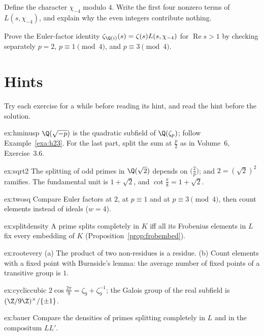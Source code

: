 \begin{exercise}[$\star\star$]\label{ex:v13-extra-11-3}
Define the character $\chi_{-4}$ modulo $4$. Write the first four nonzero terms of $L(s,\chi_{-4})$, and explain why the even integers contribute nothing.
\end{exercise}

\begin{exercise}[$\star\star\star$]\label{ex:v13-extra-11-4}
Prove the Euler-factor identity $\zeta_{\Q(i)}(s)=\zeta(s)L(s,\chi_{-4})$ for $\operatorname{Re}s>1$ by checking separately $p=2$, $p\equiv1\pmod4$, and $p\equiv3\pmod4$.
\end{exercise}

\section{Hints}

Try each exercise for a while before reading its hint, and read the hint before the solution.

\begin{hint}{ex:hminusp}
$\Q(\sqrt{-p})$ is the quadratic subfield of $\Q(\zeta_p)$; follow Example~\ref{exa:h23}. For the last part, split the sum at $\frac p2$ as in
Volume~6, Exercise~3.6.
\end{hint}
\begin{hint}{ex:sqrt2}
The splitting of odd primes in $\Q(\sqrt2)$ depends on $\bigl(\frac2p\bigr)$; and $2=(\sqrt2)^2$ ramifies. The fundamental unit is $1+\sqrt2$, and
$\cot\frac\pi8=1+\sqrt2$.
\end{hint}
\begin{hint}{ex:twosq}
Compare Euler factors at $2$, at $p\equiv1$ and at $p\equiv3\pmod4$, then count elements instead of ideals ($w=4$).
\end{hint}
\begin{hint}{ex:splitdensity}
A prime splits completely in $K$ iff all its Frobenius elements in $L$ fix every embedding of $K$ (Proposition~\ref{prop:frobembed}).
\end{hint}
\begin{hint}{ex:rootevery}
(a) The product of two non-residues is a residue. (b) Count elements with a fixed point with Burnside's lemma: the average number of fixed
points of a transitive group is $1$.
\end{hint}
\begin{hint}{ex:cycliccubic}
$2\cos\frac{2\pi}9=\zeta_9+\zeta_9^{-1}$; the Galois group of the real subfield is $(\Z/9\Z)^\times/\{\pm1\}$.
\end{hint}
\begin{hint}{ex:bauer}
Compare the densities of primes splitting completely in $L$ and in the compositum $LL'$.
\end{hint}

